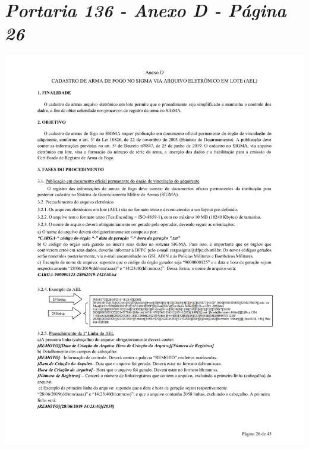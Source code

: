 \chapter{\textit{Portaria 136 - Anexo D - Página 26}}
\label{sec:anexoA1}

\includegraphics[scale=0.8]{imagens/AnexoA1-AnexoD-portaria-136}



